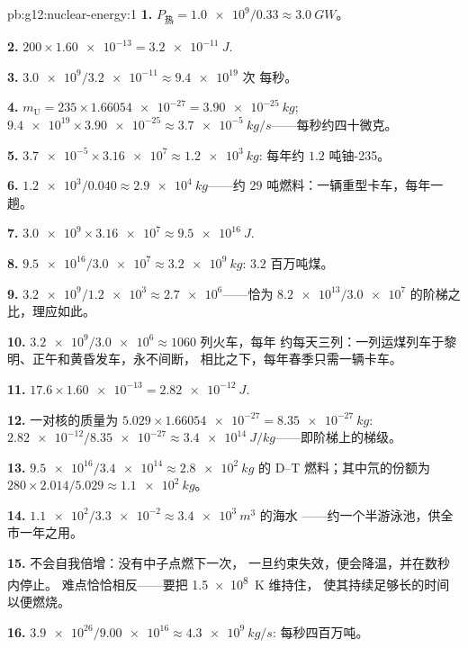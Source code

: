 \begin{solution}{pb:g12:nuclear-energy:1}
\textbf{1.} $P_{\text{热}} = \num{1.0e9}/0.33 \approx \qty{3.0}{GW}$。

\textbf{2.} $200 \times \num{1.60e-13} = \qty{3.2e-11}{J}$.

\textbf{3.} $\num{3.0e9}/\num{3.2e-11} \approx \num{9.4e19}$ 次
每秒。

\textbf{4.} $m_{\mathrm U} = 235 \times \num{1.66054e-27} =
\qty{3.90e-25}{kg}$; $\num{9.4e19} \times \num{3.90e-25} \approx
\qty{3.7e-5}{kg/s}$——每秒约四十微克。

\textbf{5.} $\num{3.7e-5} \times \num{3.16e7} \approx \qty{1.2e3}{kg}$:
每年约 $1.2$ 吨铀-235。

\textbf{6.} $\num{1.2e3}/0.040 \approx \qty{2.9e4}{kg}$——约 $29$
吨燃料：一辆重型卡车，每年一趟。

\textbf{7.} $\num{3.0e9} \times \num{3.16e7} \approx \qty{9.5e16}{J}$.

\textbf{8.} $\num{9.5e16}/\num{3.0e7} \approx \qty{3.2e9}{kg}$: $3.2$
百万吨煤。

\textbf{9.} $\num{3.2e9}/\num{1.2e3} \approx \num{2.7e6}$——恰为
$\num{8.2e13}/\num{3.0e7}$ 的阶梯之比，理应如此。

\textbf{10.} $\num{3.2e9}/\num{3.0e6} \approx 1060$ 列火车，每年
约每天三列：一列运煤列车于黎明、正午和黄昏发车，永不间断，
相比之下，每年春季只需一辆卡车。

\textbf{11.} $17.6 \times \num{1.60e-13} = \qty{2.82e-12}{J}$.

\textbf{12.} 一对核的质量为 $5.029 \times \num{1.66054e-27} =
\qty{8.35e-27}{kg}$: $\num{2.82e-12}/\num{8.35e-27} \approx
\qty{3.4e14}{J/kg}$——即阶梯上的梯级。

\textbf{13.} $\num{9.5e16}/\num{3.4e14} \approx \qty{2.8e2}{kg}$ 的 D--T
燃料；其中氘的份额为 $280 \times 2.014/5.029 \approx \qty{1.1e2}{kg}$。

\textbf{14.} $\num{1.1e2}/\num{3.3e-2} \approx \qty{3.4e3}{m^3}$ 的海水
——约一个半游泳池，供全市一年之用。

\textbf{15.} 不会自我倍增：没有中子点燃下一次，
一旦约束失效，便会降温，并在数秒内停止。
难点恰恰相反——要把 \qty{1.5e8}{K} 维持住，
使其持续足够长的时间以便燃烧。

\textbf{16.} $\num{3.9e26}/\num{9.00e16} \approx \qty{4.3e9}{kg/s}$:
每秒四百万吨。


\end{solution}
